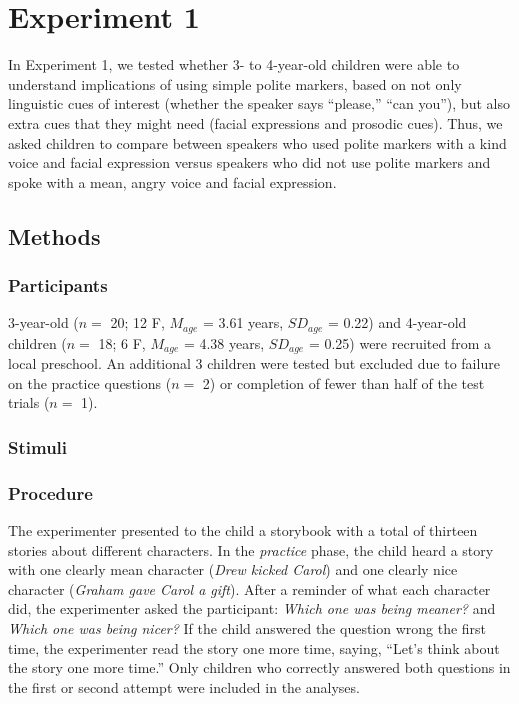 \documentclass[10pt, letterpaper]{article}
\begin{document}
\section{Experiment 1}\label{experiment-1}

In Experiment 1, we tested whether 3- to 4-year-old children were able
to understand implications of using simple polite markers, based on not
only linguistic cues of interest (whether the speaker says ``please,''
``can you''), but also extra cues that they might need (facial
expressions and prosodic cues). Thus, we asked children to compare
between speakers who used polite markers with a kind voice and facial
expression versus speakers who did not use polite markers and spoke with
a mean, angry voice and facial expression.

\subsection{Methods}\label{methods}

\subsubsection{Participants}\label{participants}

3-year-old (\(n=\) 20; 12 F, \(M_{age}\) = 3.61 years, \(SD_{age}\) =
0.22) and 4-year-old children (\(n=\) 18; 6 F, \(M_{age}\) = 4.38 years,
\(SD_{age}\) = 0.25) were recruited from a local preschool. An
additional 3 children were tested but excluded due to failure on the
practice questions (\(n=\) 2) or completion of fewer than half of the
test trials (\(n=\) 1).

\subsubsection{Stimuli}\label{stimuli}

\subsubsection{Procedure}\label{procedure}

The experimenter presented to the child a storybook with a total of
thirteen stories about different characters. In the \emph{practice}
phase, the child heard a story with one clearly mean character
(\emph{Drew kicked Carol}) and one clearly nice character (\emph{Graham
gave Carol a gift}). After a reminder of what each character did, the
experimenter asked the participant: \emph{Which one was being meaner?}
and \emph{Which one was being nicer?} If the child answered the question
wrong the first time, the experimenter read the story one more time,
saying, ``Let's think about the story one more time.'' Only children who
correctly answered both questions in the first or second attempt were
included in the analyses.
\end{document}
